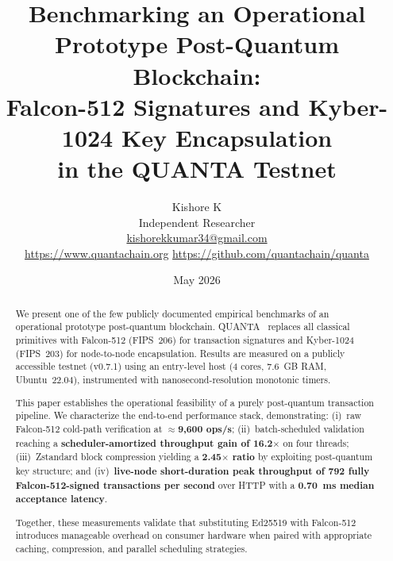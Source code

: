 \documentclass[11pt,a4paper]{article}
\begin{document}
\title{\textbf{Benchmarking an Operational Prototype Post-Quantum Blockchain:\\
Falcon-512 Signatures and Kyber-1024 Key Encapsulation\\
in the QUANTA Testnet}}

\author{
  Kishore K\\
  \small Independent Researcher\\
  \small \href{mailto:kishorekkumar34@gmail.com}{kishorekkumar34@gmail.com}\\
  \small \url{https://www.quantachain.org} \quad
  \url{https://github.com/quantachain/quanta}
}

\date{May 2026}
\maketitle
\thispagestyle{empty}

\begin{abstract}
We present one of the few publicly documented empirical benchmarks of an operational prototype
post-quantum blockchain. QUANTA~\cite{quanta2026} replaces all classical primitives with
Falcon-512 (FIPS~206) for transaction signatures and Kyber-1024 (FIPS~203) for node-to-node
encapsulation. Results are measured on a publicly accessible testnet (v0.7.1) using an entry-level
host (4 cores, 7.6~GB RAM, Ubuntu~22.04), instrumented with nanosecond-resolution monotonic timers.

This paper establishes the operational feasibility of a purely post-quantum transaction pipeline.
We characterize the end-to-end performance stack, demonstrating: (i)~raw Falcon-512 cold-path
verification at \textbf{$\approx$9,600 ops/s}; (ii)~batch-scheduled validation reaching a
\textbf{scheduler-amortized throughput gain of 16.2$\times$} on four threads;
(iii)~Zstandard block compression yielding a \textbf{2.45$\times$ ratio} by exploiting 
post-quantum key structure; and (iv)~\textbf{live-node short-duration peak throughput of 792
fully Falcon-512-signed transactions per second} over HTTP with a \textbf{0.70~ms median
acceptance latency}.

Together, these measurements validate that substituting Ed25519 with Falcon-512 introduces
manageable overhead on consumer hardware when paired with appropriate caching, compression, and 
parallel scheduling strategies.
\end{abstract}
\end{document}
